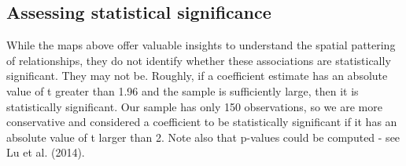 \documentclass[
  letterpaper,
  krantz2]{style/krantz}
\begin{document}
\hypertarget{assessing-statistical-significance}{%
\subsection{Assessing statistical
significance}\label{assessing-statistical-significance}}

While the maps above offer valuable insights to understand the spatial
pattering of relationships, they do not identify whether these
associations are statistically significant. They may not be. Roughly, if
a coefficient estimate has an absolute value of t greater than 1.96 and
the sample is sufficiently large, then it is statistically significant.
Our sample has only 150 observations, so we are more conservative and
considered a coefficient to be statistically significant if it has an
absolute value of t larger than 2. Note also that p-values could be
computed - see Lu et al. (2014).
\end{document}
